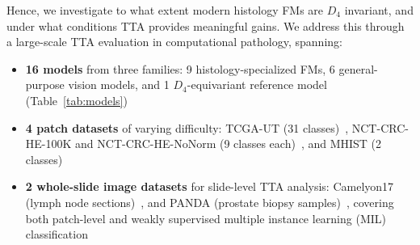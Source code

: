 \documentclass{melba}
\begin{document}
Hence, we investigate to what extent modern histology FMs are $D_4$ invariant, and under what conditions TTA provides meaningful gains. We address this through a large-scale TTA evaluation in computational pathology, spanning:
\begin{itemize}
    \item \textbf{16 models} from three families: 9 histology-specialized FMs, 6 general-purpose vision models, and 1 $D_4$-equivariant reference model (Table~\ref{tab:models})
    \item \textbf{4 patch datasets} of varying difficulty: TCGA-UT (31 classes)~\citep{komura2022universal}, NCT-CRC-HE-100K and NCT-CRC-HE-NoNorm (9 classes each)~\citep{kather2019predicting}, and MHIST (2 classes)~\citep{wei2021petri}
    \item \textbf{2 whole-slide image datasets} for slide-level TTA analysis: Camelyon17 (lymph node sections)~\citep{bandi2018camelyon17}, and PANDA (prostate biopsy samples)~\citep{bulten2022artificial}, covering both patch-level and weakly supervised multiple instance learning (MIL) classification
\end{itemize}
\end{document}
